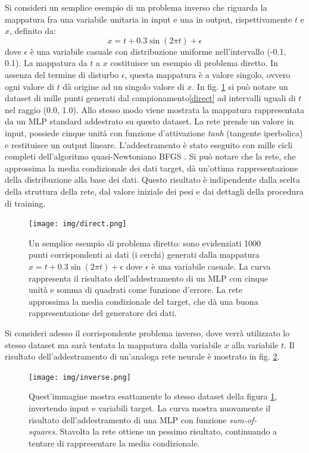 Si consideri un semplice esempio di un problema inverso che riguarda la mappatura fra una variabile unitaria in input e una in output, rispettivamente $t$ e $x$, definito da:
\begin{equation}
	\label{direct}
	x = t + 0.3 \sin(2 \pi t) + \epsilon
\end{equation}
dove $\epsilon$ è una variabile casuale con distribuzione uniforme nell'intervallo (-0.1, 0.1). La mappatura da $t$ a $x$ costituisce un esempio di problema diretto. In assenza del termine di disturbo $\epsilon$, questa mappatura è a valore singolo, ovvero ogni valore di $t$ dà origine ad un singolo valore di $x$. In fig. \ref{fig:1.20} si può notare un dataset di mille punti generati dal campionamento\ref{direct} ad intervalli uguali di $t$ nel raggio (0.0, 1.0). Allo stesso modo viene mostrata la mappatura rappresentata da un MLP standard addestrato su questo dataset. La rete prende un valore in input, possiede cinque unità con funzione d'attivazione \textit{tanh} (tangente iperbolica) e restituisce un output lineare. L'addestramento è stato eseguito con mille cicli completi dell'algoritmo quasi-Newtoniano BFGS \cite{bfgs}. Si può notare che la rete, che approssima la media condizionale dei dati target, dà un'ottima rappresentazione della distribuzione alla base dei dati. Questo risultato è indipendente dalla scelta della struttura della rete, dal valore iniziale dei pesi e dai dettagli della procedura di training.
\begin{figure}[ht]
	\centering
	\texttt{[image: img/direct.png]}
	\caption{Un semplice esempio di problema diretto: sono evidenziati 1000 punti corrispondenti ai dati (i cerchi) generati dalla mappatura $x = t + 0.3 \sin(2 \pi t) + \epsilon$ dove $\epsilon$ è una variabile casuale. La curva rappresenta il risultato dell'addestramento di un MLP con cinque unità e somma di quadrati come funzione d'errore. La rete approssima la media condizionale del target, che dà una buona rappresentazione del generatore dei dati.}
	\label{fig:1.20}
\end{figure}

Si consideri adesso il corrispondente problema inverso, dove verrà utilizzato lo stesso dataset ma sarà tentata la mappatura dalla variabile $x$ alla variabile $t$. Il risultato dell'addestramento di un'analoga rete neurale è mostrato in fig. \ref{fig:1.21}.
\begin{figure}[ht]
	\centering
	\texttt{[image: img/inverse.png]}
	\caption{Quest'immagine mostra esattamente lo stesso dataset della figura \ref{fig:1.20}, invertendo input e variabili target. La curva mostra nuovamente il risultato dell'addestramento di una MLP con funzione \textit{sum-of-squares}. Stavolta la rete ottiene un pessimo risultato, continuando a tentare di rappresentare la media condizionale.}
	\label{fig:1.21}
\end{figure}

